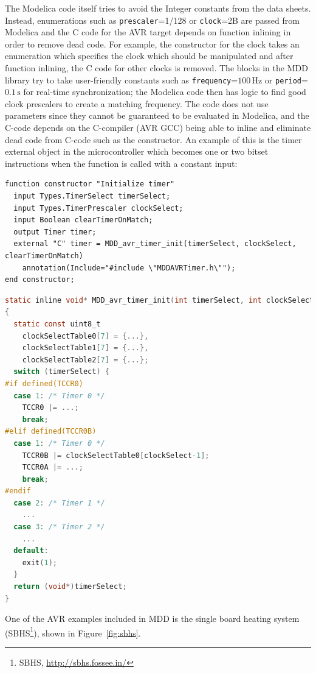 \documentclass{resources/modelica}
\newcommand{\modelica}[1]{\lstinline[language=modelica]|#1|}
\begin{document}
The Modelica code itself tries to avoid the Integer constants from the
data sheets.
Instead, enumerations such as \modelica{prescaler}=1/128 or \modelica{clock}=2B are
passed from Modelica and the C code for the AVR target depends on
function inlining in order to remove dead code.
For example, the constructor for the clock takes an enumeration which
specifies the clock which should be manipulated and after function inlining, the
C code for other clocks is removed.
The blocks in the MDD library try to take user-friendly constants
such as \modelica{frequency}=$100\,\mathrm{Hz}$ or \modelica{period}=$0.1\,\mathrm{s}$ for real-time synchronization; the
Modelica code then has logic to find good clock prescalers to create a
matching frequency.
The code does not use parameters since they cannot be guaranteed to be
evaluated in Modelica, and the C-code depends on the C-compiler (AVR GCC)
being able to inline and eliminate dead code from C-code such as the constructor.
An example of this is the timer external object in the microcontroller which becomes one or two bitset
instructions when the function is called with a constant input:
\begin{lstlisting}[language=Modelica]
function constructor "Initialize timer"
  input Types.TimerSelect timerSelect;
  input Types.TimerPrescaler clockSelect;
  input Boolean clearTimerOnMatch;
  output Timer timer;
  external "C" timer = MDD_avr_timer_init(timerSelect, clockSelect, clearTimerOnMatch)
    annotation(Include="#include \"MDDAVRTimer.h\"");
end constructor;
\end{lstlisting}
\begin{lstlisting}[language=C]
static inline void* MDD_avr_timer_init(int timerSelect, int clockSelect, int clearTimerOnMatch)
{
  static const uint8_t
    clockSelectTable0[7] = {...},
    clockSelectTable1[7] = {...},
    clockSelectTable2[7] = {...};
  switch (timerSelect) {
#if defined(TCCR0)
  case 1: /* Timer 0 */
    TCCR0 |= ...;
    break;
#elif defined(TCCR0B)
  case 1: /* Timer 0 */
    TCCR0B |= clockSelectTable0[clockSelect-1];
    TCCR0A |= ...;
    break;
#endif
  case 2: /* Timer 1 */
    ...
  case 3: /* Timer 2 */
    ...
  default:
    exit(1);
  }
  return (void*)timerSelect;
}
\end{lstlisting}
One of the AVR examples included in MDD is the single board heating system (SBHS\footnote{SBHS, \url{http://sbhs.fossee.in/}}), shown in Figure~\ref{fig:sbhs}.
\end{document}
